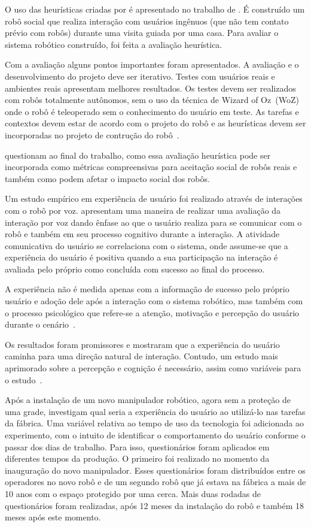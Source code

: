 O uso das heurísticas criadas por  é apresentado no trabalho de . É construído um robô social que realiza interação com usuários ingênuos (que não tem contato prévio com robôs) durante uma visita guiada por uma casa. Para avaliar o sistema robótico construído, foi feita a avaliação heurística.

Com a avaliação alguns pontos importantes foram apresentados. A avaliação e o desenvolvimento do projeto deve ser iterativo. Testes com usuários reais e ambientes reais apresentam melhores resultados. Os testes devem ser realizados com robôs totalmente autônomos, sem o uso da técnica de Wizard of Oz~(WoZ) onde o robô é teleoperado sem o conhecimento do usuário em teste. As tarefas e contextos devem estar de acordo com o projeto do robô e as heurísticas devem ser incorporadas no projeto de contrução do robô~\cite{lohse:2008}.

 questionam ao final do trabalho, como essa avaliação heurística pode ser incorporada como métricas compreensivas para aceitação social de robôs reais e também como podem afetar o impacto social dos robôs.

Um estudo empírico em experiência de usuário foi realizado através de interações com o robô por voz.  apresentam uma maneira de realizar uma avaliação da interação por voz dando ênfase ao que o usuário realiza para se comunicar com o robô e também em seu processo cognitivo durante a interação. A atividade comunicativa do usuário se correlaciona com o sistema, onde assume-se que a experiência do usuário é positiva quando a sua participação na interação é avaliada pelo próprio como concluída com sucesso ao final do processo.

A experiência não é medida apenas com a informação de sucesso pelo próprio usuário e adoção dele após a interação com o sistema robótico, mas também com o processo psicológico que refere-se a atenção, motivação e percepção do usuário durante o cenário~\cite{jokinen:2013}.

Os resultados foram promissores e mostraram que a experiência do usuário caminha para uma direção natural de interação. Contudo, um estudo mais aprimorado sobre a percepção e cognição é necessário, assim como variáveis para o estudo~\cite{jokinen:2013}.

Após a instalação de um novo manipulador robótico, agora sem a proteção de uma grade,  investigam qual seria a experiência do usuário ao utilizá-lo nas tarefas da fábrica. Uma variável relativa ao tempo de uso da tecnologia foi adicionada ao experimento, com o intuito de identificar o comportamento do usuário conforme o passar dos dias de trabalho. Para isso, questionários foram aplicados em diferentes tempos da produção. O primeiro foi realizado no momento da inauguração do novo manipulador. Esses questionários foram distribuídos entre os operadores no novo robô e de um segundo robô que já estava na fábrica a mais de 10 anos com o espaço protegido por uma cerca. Mais duas rodadas de questionários foram realizadas, após 12 meses da instalação do robô e também 18 meses após este momento.

